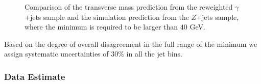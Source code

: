 \begin{figure}[!htbp]
\begin{center}
\caption{Comparison of the transverse mass prediction from the reweighted $\gamma$+jets sample 
and the simulation prediction from the $Z$+jets sample, where the minimum \met is required to be larger than 
$40$ GeV. }
\label{fig:PhotonJetsClosureTest_MtHZZ_MetPresel}
\end{center}
\end{figure}



Based on the degree of overall disagreement in the full range of the minimum \met we assign 
systematic uncertainties of $30\%$ in all the jet bins.


\subsubsection{Data Estimate}

